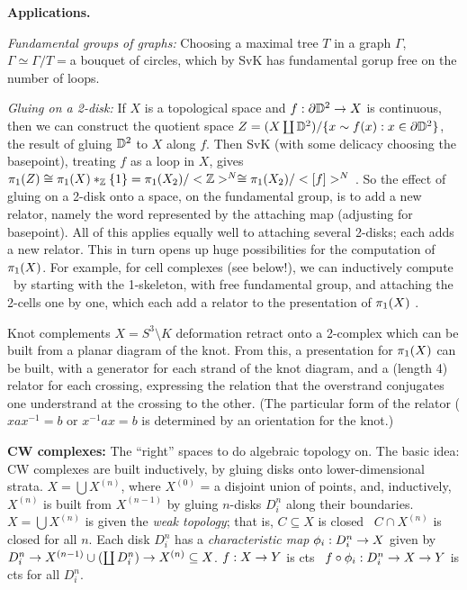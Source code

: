 \documentclass[12pt]{article}
\begin{document}
\ssk

{\bf Applications.} 

{\it Fundamental groups of graphs:} Choosing a maximal tree $T$ in a graph $\Gamma$,
$\Gamma \simeq \Gamma/T = $a bouquet of circles, which by SvK has fundamental gorup free on the number
of loops.

{\it Gluing on a 2-disk:} If $X$ is a topological space and $f:\partial {\mathbb D}^2\rightarrow X$ is continuous, then we
can construct the quotient space $Z=(X\coprod {\mathbb D}^2)/\{x\sim f(x) : x\in\partial{\mathbb D}^2\}$,
the result of gluing ${\mathbb D}^2$ to $X$ along $f$. Then SvK (with some delicacy choosing the basepoint),
treating $f$ as a loop in $X$, gives
$\pi_1(Z)\cong \pi_1(X)*_{\mathbb Z}\{1\} = \pi_1(X_2)/<{\mathbb Z}>^N \cong \pi_1(X_2)/<[f]>^N$ .
So the effect of gluing on a 2-disk onto a space, on the fundamental group, is to add a new relator, 
namely the word represented by the attaching map (adjusting for basepoint).
All of this applies equally well to attaching several 
2-disks; each adds a new relator. 
This in turn opens up huge possibilities for the computation of $\pi_1(X)$. For example, for cell complexes
(see below!),
we can inductively compute \mpu\ by starting with the 1-skeleton, with free fundamental group, and 
attaching the 2-cells one by one, which each add a relator to the presentation of $\pi_1(X)$  .

Knot complements $X=S^3\setminus K$ deformation retract onto a 2-complex which can be built from a planar diagram of the 
knot. From this, a presentation for $\pi_1(X)$ can be built, with a generator for each strand of the
knot diagram, and a (length 4) relator for each crossing, expressing the relation that
the overstrand conjugates one understrand at the crossing to the other. (The particular form
of the relator ($xax^{-1}=b$ or $x^{-1}ax=b$ is determined by an orientation for the knot.)

\msk

{\bf CW complexes:} The ``right'' spaces to do algebraic topology on.
The basic idea: CW complexes are built inductively, by gluing 
disks onto lower-dimensional strata. $X=\bigcup X^{(n)}$, where
$X^{(0)}$ = a disjoint union of points, and, inductively,
$X^{(n)}$ is built from $X^{(n-1)}$ by gluing $n$-disks $D^n_i$
along their boundaries. 
$X=\bigcup X^{(n)}$
is given the {\it weak topology}; that is,  $C\subseteq X$ is closed \lra\
$C\cap X^{(n)}$ is closed for all $n$. 
Each disk $D^n_i$ has a {\it characteristic map} $\phi_i:D^n_i\rightarrow X$
given by 
$D^n_i\rightarrow X^{(n-1)}\cup(\coprod D^n_i)\rightarrow X^{(n)}\subseteq X$.
$f:X\rightarrow Y$ is cts \lra\ $f\circ \phi_i:D^n_i\rightarrow X\rightarrow Y$ is cts for 
all $D^n_i$. 
\end{document}
